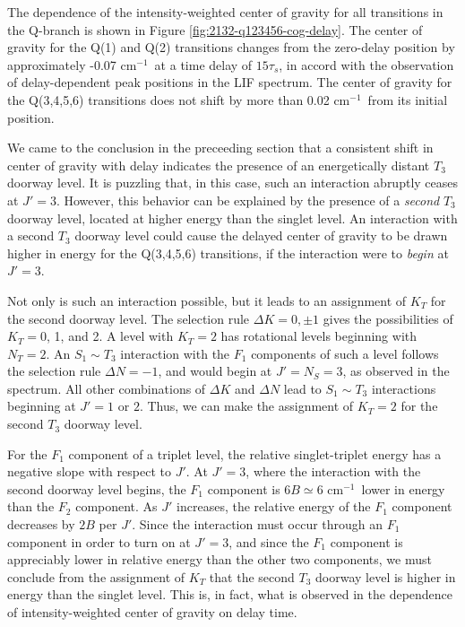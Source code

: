 \documentclass[12pt]{mitthesis}
\newcommand{\rcm}{cm$^{-1}$}
\begin{document}
The dependence of the intensity-weighted center of gravity for all
transitions in the Q-branch is shown in Figure
\ref{fig:2132-q123456-cog-delay}.  The center of gravity for the Q(1)
and Q(2) transitions changes from the zero-delay position by
approximately -0.07 \rcm\ at a time delay of $15\tau_s$, in accord
with the observation of delay-dependent peak positions in the LIF
spectrum.  The center of gravity for the Q(3,4,5,6) transitions does
not shift by more than 0.02 \rcm\ from its initial position.

We came to the conclusion in the preceeding section that a consistent
shift in center of gravity with delay indicates the presence of an
energetically distant $T_3$ doorway level.  It is puzzling that, in
this case, such an interaction abruptly ceases at
$J'=3$.  However, this behavior can be explained by the presence of a
\emph{second} $T_3$ doorway level, located at higher energy than the
singlet level.  An interaction with a second $T_3$ doorway level could
cause the delayed center of gravity to be drawn higher in energy for
the Q(3,4,5,6) transitions, if the interaction were to \emph{begin} at
$J'=3$.

Not only is such an interaction possible, but it leads to an
assignment of $K_T$ for the second doorway level.  The selection rule
$\Delta K = 0, \pm 1$ gives the possibilities of $K_T=$0, 1, and 2.  A
level with $K_T=2$ has rotational levels beginning with $N_T=2$.  An
$S_1 \sim T_3$ interaction with the $F_1$ components of such a level
follows the selection rule $\Delta N = -1$, and would begin at
$J'=N_S=3$, as observed in the spectrum.  All other combinations of
$\Delta K$ and $\Delta N$ lead to $S_1 \sim T_3$ interactions
beginning at $J'=1$ or $2$.  Thus, we can make the assignment of
$K_T=2$ for the second $T_3$ doorway level.

For the $F_1$ component of a triplet level, the relative
singlet-triplet energy has a negative slope with respect to $J'$.  At
$J'=3$, where the interaction with the second doorway level begins,
the $F_1$ component is $6B \simeq 6$ \rcm\ lower in energy than the
$F_2$ component.  As $J'$ increases, the relative energy of the $F_1$
component decreases by $2B$ per $J'$.  Since the interaction must
occur through an $F_1$ component in order to turn on at $J'=3$, and
since the $F_1$ component is appreciably lower in relative energy than
the other two components, we must conclude from the assignment of
$K_T$ that the second $T_3$ doorway level is higher in energy than the
singlet level.  This is, in fact, what is observed in the dependence
of intensity-weighted center of gravity on delay time.
\end{document}
